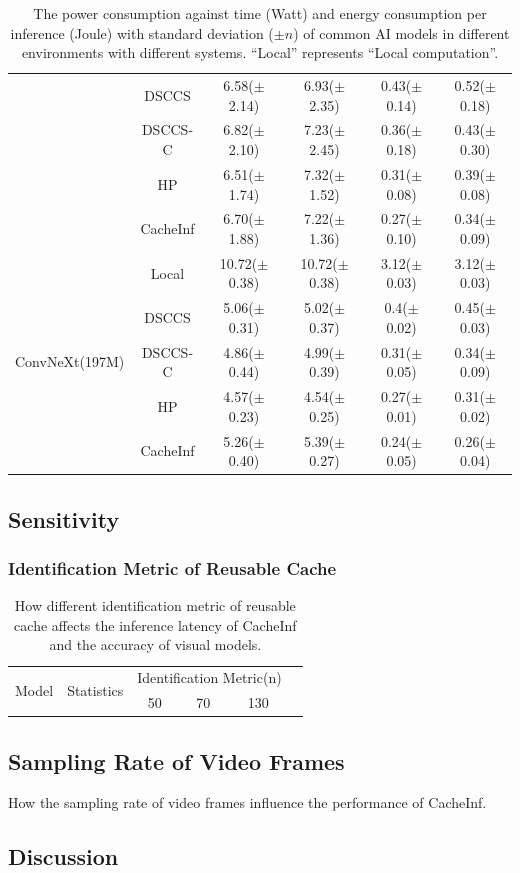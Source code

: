 \begin{table}[htb]
\begin{tabular}{cc|c|c|c|c}
& DSCCS & 6.58($\pm$2.14) & 6.93($\pm$2.35) & 0.43($\pm$0.14) & 0.52($\pm$0.18) \\
 & DSCCS-C & 6.82($\pm$2.10) & 7.23($\pm$2.45) & 0.36($\pm$0.18) & 0.43($\pm$0.30) \\
 & HP & 6.51($\pm$1.74) & 7.32($\pm$1.52) & 0.31($\pm$0.08) & 0.39($\pm$0.08) \\
 & CacheInf & 6.70($\pm$1.88) & 7.22($\pm$1.36) & 0.27($\pm$0.10) & 0.34($\pm$0.09) \\
\cline{1-6}
\multirow[c]{5}{*}{ConvNeXt(197M)} & Local & 10.72($\pm$0.38) & 10.72($\pm$0.38) & 3.12($\pm$0.03) & 3.12($\pm$0.03) \\
& DSCCS & 5.06($\pm$0.31) & 5.02($\pm$0.37) & 0.4($\pm$0.02) & 0.45($\pm$0.03) \\
 & DSCCS-C & 4.86($\pm$0.44) & 4.99($\pm$0.39) & 0.31($\pm$0.05) & 0.34($\pm$0.09) \\
 & HP & 4.57($\pm$0.23) & 4.54($\pm$0.25) & 0.27($\pm$0.01) & 0.31($\pm$0.02) \\
 & CacheInf & 5.26($\pm$0.40) & 5.39($\pm$0.27) & 0.24($\pm$0.05) & 0.26($\pm$0.04) \\
\cline{1-6}
\bottomrule
\end{tabular}
    \caption{The power consumption against time (Watt) and energy consumption per inference (Joule) with standard deviation ($\pm n$) of common AI models in different environments with different systems. ``Local'' represents ``Local computation''.}
    \label{tab:torchvision_power}
\end{table}

\subsection{Sensitivity}
\subsubsection{Identification Metric of Reusable Cache}

\begin{table}[!h]
    \begin{tabular}{c|c|c|c|c|c|}
        \toprule
        \multirow[c]{2}{*}{Model} & \multirow[c]{2}{*}{Statistics} & \multicolumn{3}{|c|}{Identification Metric(n)} \\
        & & 50 & 70 & 130 \\

    \end{tabular}
    \caption[accuracy]{How different identification metric of reusable cache affects the inference latency of CacheInf and the accuracy of visual models.}
\end{table}

\subsection{Sampling Rate of Video Frames}

\begin{table}[htb]
    \caption[sample rates]{How the sampling rate of video frames influence the performance of CacheInf.}
\end{table}

\subsection{Discussion}